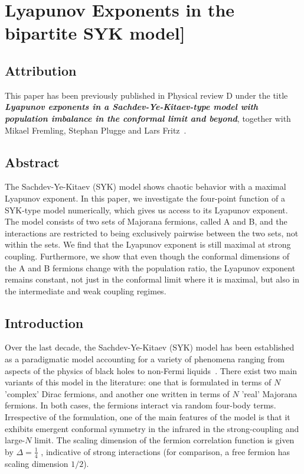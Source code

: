 \chapter{Lyapunov Exponents in the bipartite SYK model]}
\label{ch:LyapbSYK}

\section*{Attribution}
This paper has been previously published in Physical review D under the title \textbf{\textit{Lyapunov exponents in a Sachdev-Ye-Kitaev-type model with population imbalance in the conformal limit and beyond}}, together with Mikael Fremling, Stephan Plugge and Lars Fritz~\cite{shankar2023lyapunov}.

\section*{Abstract}
The Sachdev-Ye-Kitaev (SYK) model shows chaotic behavior with a maximal Lyapunov exponent. In this paper, we investigate the four-point function of a SYK-type model numerically, which gives us access to its Lyapunov exponent. The model consists of two sets of Majorana fermions, called A and B, and the interactions are restricted to being exclusively pairwise between the two sets, not within the sets. We find that the Lyapunov exponent is still maximal at strong coupling. Furthermore, we show that even though the conformal dimensions of the A and B fermions change with the population ratio, the Lyapunov exponent remains constant, not just in the conformal limit where it is maximal, but also in the intermediate and weak coupling regimes.

\section{Introduction}
Over the last decade, the Sachdev-Ye-Kitaev (SYK) model has been established as a paradigmatic model accounting for a variety of phenomena ranging from aspects of the physics of black holes to non-Fermi liquids~\cite{Chowdhury-RMP2022,Rosenhaus2019-review,Franz2018-review,patel_quantum_2017,tikhanovskaya2022maximal}.
There exist two main variants of this model in the literature: one that is formulated in terms of $N$ 'complex' Dirac fermions,
and another one written in terms of $N$ 'real' Majorana fermions.
In both cases, the fermions interact via random four-body terms.
Irrespective of the formulation, one of the main features of the model is that it exhibits emergent conformal symmetry in the infrared in the strong-coupling and large-$N$ limit.
The scaling dimension of the fermion correlation function is given by $\Delta = \frac{1}{4}$ \cite{maldacena_comments_2016,polchinski_spectrum_2016},
indicative of strong interactions (for comparison, a free fermion has scaling dimension $1/2$). 

